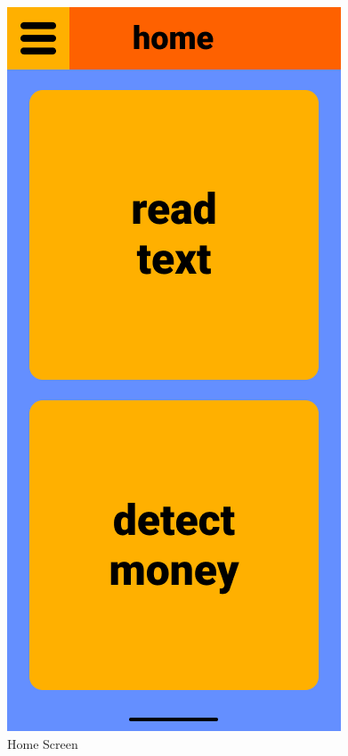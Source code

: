 \documentclass[a4paper,11pt]{article}
\begin{document}
\begin{figure}[H]
\centering
\includegraphics[scale=0.45]{img/main_screen_1.png}
\caption{Home Screen}
\label{fig:main_screen}
\end{figure}
\end{document}
